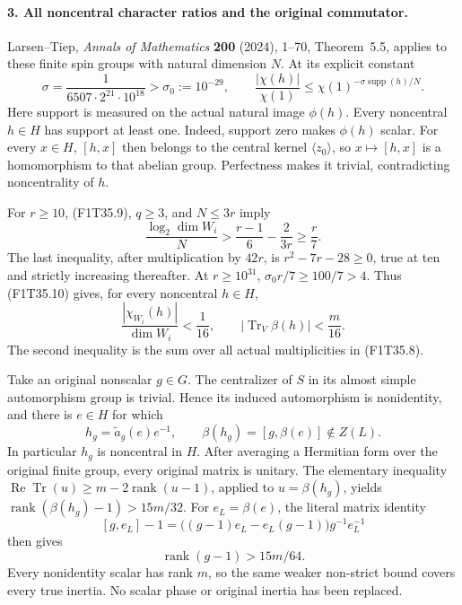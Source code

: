 \paragraph{3. All noncentral character ratios and the original commutator.}
Larsen--Tiep, \emph{Annals of Mathematics}
\textbf{200} (2024), 1--70, Theorem~5.5, applies
to these finite spin groups with natural
dimension \(N\). At its explicit constant
\[
 \sigma=\frac1{6507\cdot2^{21}\cdot10^{18}}
                >\sigma_0:=10^{-29},
 \qquad
 \frac{|\chi(h)|}{\chi(1)}
        \le\chi(1)^{-\sigma\operatorname{supp}(h)/N}.
 \tag{F1T35.10}
\]
Here support is measured on the actual natural
image \(\phi(h)\). Every noncentral \(h\in H\)
has support at least one. Indeed, support zero
makes \(\phi(h)\) scalar. For every \(x\in H\),
\([h,x]\) then belongs to the central kernel
\(\langle z_0\rangle\), so
\(x\mapsto[h,x]\) is a homomorphism to that
abelian group. Perfectness makes it trivial,
contradicting noncentrality of \(h\).

For \(r\ge10\), (F1T35.9), \(q\ge3\), and
\(N\le3r\) imply
\[
 \frac{\log_2\dim W_i}{N}
  >\frac{r-1}{6}-\frac{2}{3r}\ge\frac r7.
 \tag{F1T35.11}
\]
The last inequality, after multiplication by
\(42r\), is \(r^2-7r-28\ge0\), true at ten
and strictly increasing thereafter. At
\(r\ge10^{31}\),
\(\sigma_0r/7\ge100/7>4\).
Thus (F1T35.10) gives, for every noncentral
\(h\in H\),
\[
 \frac{|\chi_{W_i}(h)|}{\dim W_i}<\frac1{16},
 \qquad
 \left|\operatorname{Tr}_{V}\beta(h)\right|<\frac m{16}.
 \tag{F1T35.12}
\]
The second inequality is the sum over all actual
multiplicities in (F1T35.8).

Take an original nonscalar \(g\in G\). The
centralizer of \(S\) in its almost simple
automorphism group is trivial. Hence its induced
automorphism is nonidentity, and there is
\(e\in H\) for which
\[
 h_g=\widetilde a_g(e)e^{-1},\qquad
 \beta(h_g)=[g,\beta(e)]\notin Z(L).
 \tag{F1T35.13}
\]
In particular \(h_g\) is noncentral in \(H\).
After averaging a Hermitian form over the
original finite group, every original matrix
is unitary. The elementary inequality
\(\operatorname{Re}\operatorname{Tr}(u)
\ge m-2\operatorname{rank}(u-1)\), applied to
\(u=\beta(h_g)\), yields
\(\operatorname{rank}(\beta(h_g)-1)>15m/32\).
For \(e_L=\beta(e)\), the literal matrix identity
\[
 [g,e_L]-1
  =\bigl((g-1)e_L-e_L(g-1)\bigr)g^{-1}e_L^{-1}
 \tag{F1T35.14}
\]
then gives
\[
                    \operatorname{rank}(g-1)>15m/64.
 \tag{F1T35.15}
\]
Every nonidentity scalar has rank \(m\), so the
same weaker non-strict bound covers every true
inertia. No scalar phase or original inertia
has been replaced.

